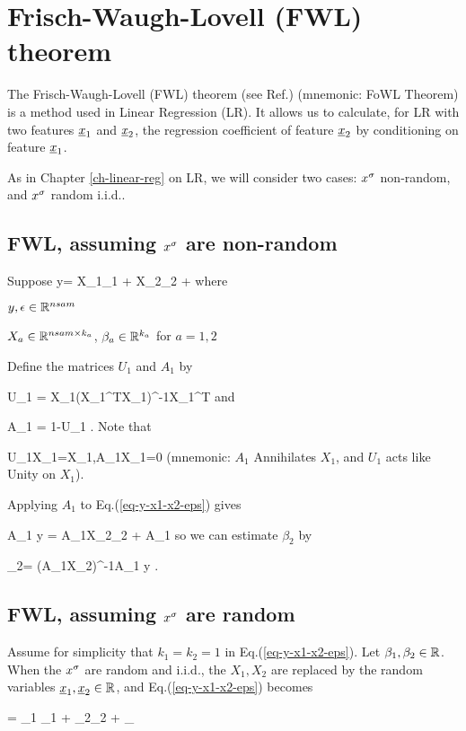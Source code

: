 \chapter{Frisch-Waugh-Lovell (FWL) theorem}
\label{ch-fwl-theo}

The Frisch-Waugh-Lovell (FWL) theorem
(see Ref.\cite{wiki-fwl-theo})
(mnemonic: FoWL Theorem)
is a method used in Linear Regression (LR).
It allows us to
calculate,
for LR with
two features $\rvx_1$ and $\rvx_2$,
the regression coefficient 
of feature $\rvx_2$
by conditioning
on feature $\rvx_1$.

As in Chapter \ref{ch-linear-reg}
on LR, we will consider
two cases: $x^\sigma$ non-random, and $x^\sigma$ random i.i.d..

\section{FWL, assuming $x^\sigma$ are non-random}
Suppose
\beq
y=  X_1\beta_1 + X_2\beta_2 + \eps
\label{eq-y-x1-x2-eps}
\eeq
where

$y, \epsilon\in { \mathbb{R}}^{nsam}$

$X_a\in { \mathbb{R}}^{nsam\times k_a}$,
$\beta_a\in { \mathbb{R}}^{k_a}$ for $a=1,2$

Define the matrices $U_1$ and $A_1$ by

\beq
U_1 = X_1(X_1^TX_1)^{-1}X_1^T
\eeq
and

\beq
A_1 = 1-U_1
\;.
\eeq
Note that

\beq
U_1X_1=X_1\;,\;\;A_1X_1=0
\eeq
(mnemonic: $A_1$ Annihilates $X_1$,
and $U_1$ acts like Unity on $X_1$).

Applying $A_1$ to Eq.(\ref{eq-y-x1-x2-eps}) gives

\beq
A_1 y = A_1X_2\beta_2  + A_1\eps
\eeq
so we can estimate $\beta_2$ by

\beq
\HAT{\beta}_2=
(A_1X_2)^{-1}A_1 y
\label{eq-fwl-nonrand}
\;.
\eeq

\section{FWL, assuming $x^\sigma$ are random}

Assume for simplicity that 
$k_1=k_2=1$
in Eq.(\ref{eq-y-x1-x2-eps}). Let
$\beta_1,\beta_2\in{ \mathbb{R}}$.
When the $x^\sigma$ are random and i.i.d.,
the
$X_1, X_2$ are
replaced by 
the random variables
$\rvx_1, \rvx_2\in \RR$,
and
Eq.(\ref{eq-y-x1-x2-eps})
becomes

\beq
\rvy = \beta_1 \rvx_1 + 
\beta_2\rvx_2 + \rveps_\rvy
\label{eq-y-x1-x2-rand}
\eeq

